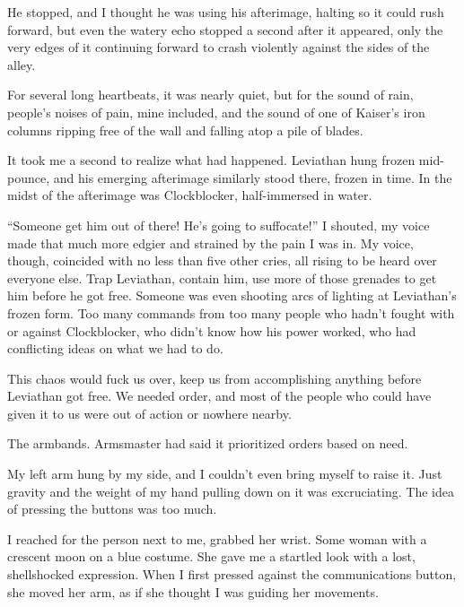 He stopped, and I thought he was using his afterimage, halting so it could rush forward, but even the watery echo stopped a second after it appeared, only the very edges of it continuing forward to crash violently against the sides of the alley.



For several long heartbeats, it was nearly quiet, but for the sound of rain, people's noises of pain, mine included, and the sound of one of Kaiser's iron columns ripping free of the wall and falling atop a pile of blades.



It took me a second to realize what had happened.  Leviathan hung frozen mid-pounce, and his emerging afterimage similarly stood there, frozen in time.  In the midst of the afterimage was Clockblocker, half-immersed in water.



``Someone get him out of there!  He's going to suffocate!'' I shouted, my voice made that much more edgier and strained by the pain I was in.  My voice, though, coincided with no less than five other cries, all rising to be heard over everyone else.  Trap Leviathan, contain him, use more of those grenades to get him before he got free.  Someone was even shooting arcs of lighting at Leviathan's frozen form.  Too many commands from too many people who hadn't fought with or against Clockblocker, who didn't know how his power worked, who had conflicting ideas on what we had to do.



This chaos would fuck us over, keep us from accomplishing anything before Leviathan got free.  We needed order, and most of the people who could have given it to us were out of action or nowhere nearby.



The armbands.  Armsmaster had said it prioritized orders based on need.



My left arm hung by my side, and I couldn't even bring myself to raise it.  Just gravity and the weight of my hand pulling down on it was excruciating.  The idea of pressing the buttons was too much.



I reached for the person next to me, grabbed her wrist.  Some woman with a crescent moon on a blue costume.  She gave me a startled look with a lost, shellshocked expression.  When I first pressed against the  communications button, she moved her arm, as if she thought I was guiding her movements.



